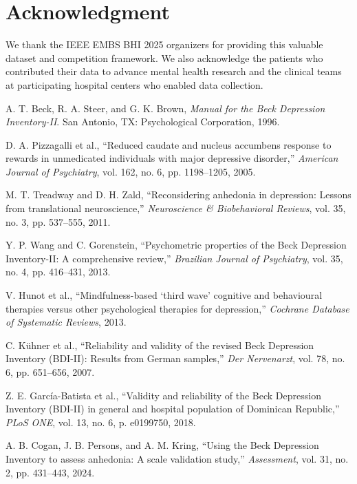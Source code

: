\documentclass[conference]{IEEEtran}
\begin{document}
\section*{Acknowledgment}
We thank the IEEE EMBS BHI 2025 organizers for providing this valuable dataset and competition framework. We also acknowledge the patients who contributed their data to advance mental health research and the clinical teams at participating hospital centers who enabled data collection.


\begin{thebibliography}{00}

 A. T. Beck, R. A. Steer, and G. K. Brown, \textit{Manual for the Beck Depression Inventory-II}. San Antonio, TX: Psychological Corporation, 1996.

 D. A. Pizzagalli et al., ``Reduced caudate and nucleus accumbens response to rewards in unmedicated individuals with major depressive disorder,'' \textit{American Journal of Psychiatry}, vol. 162, no. 6, pp. 1198–1205, 2005.

 M. T. Treadway and D. H. Zald, ``Reconsidering anhedonia in depression: Lessons from translational neuroscience,'' \textit{Neuroscience \& Biobehavioral Reviews}, vol. 35, no. 3, pp. 537–555, 2011.

 Y. P. Wang and C. Gorenstein, ``Psychometric properties of the Beck Depression Inventory-II: A comprehensive review,'' \textit{Brazilian Journal of Psychiatry}, vol. 35, no. 4, pp. 416–431, 2013.

 V. Hunot et al., ``Mindfulness-based `third wave' cognitive and behavioural therapies versus other psychological therapies for depression,'' \textit{Cochrane Database of Systematic Reviews}, 2013.

 C. Kühner et al., ``Reliability and validity of the revised Beck Depression Inventory (BDI-II): Results from German samples,'' \textit{Der Nervenarzt}, vol. 78, no. 6, pp. 651–656, 2007.

 Z. E. García-Batista et al., ``Validity and reliability of the Beck Depression Inventory (BDI-II) in general and hospital population of Dominican Republic,'' \textit{PLoS ONE}, vol. 13, no. 6, p. e0199750, 2018.

 A. B. Cogan, J. B. Persons, and A. M. Kring, ``Using the Beck Depression Inventory to assess anhedonia: A scale validation study,'' \textit{Assessment}, vol. 31, no. 2, pp. 431–443, 2024.


\end{thebibliography}
\end{document}

